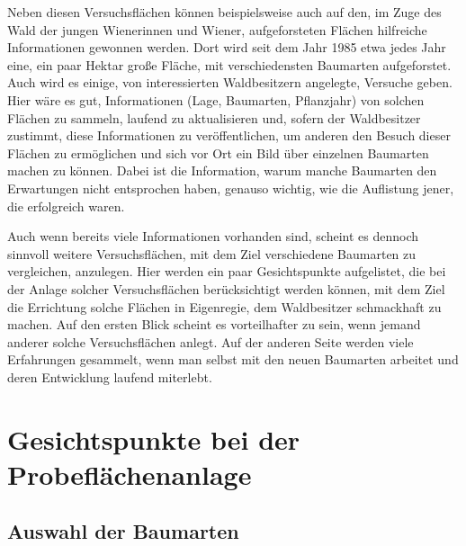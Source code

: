 \documentclass[twocolumn]{scrartcl}
\begin{document}
Neben diesen Versuchsflächen können beispielsweise auch auf den, im Zuge des
\glqq{}Wald der jungen Wienerinnen und Wiener\grqq{}, aufgeforsteten Flächen
hilfreiche Informationen gewonnen werden. Dort wird seit dem Jahr 1985 etwa
jedes Jahr eine, ein paar Hektar große Fläche, mit verschiedensten Baumarten
aufgeforstet. Auch wird es einige, von interessierten Waldbesitzern angelegte,
Versuche geben. Hier wäre es gut, Informationen (Lage, Baumarten, Pflanzjahr)
von solchen Flächen zu sammeln, laufend zu aktualisieren und, sofern der
Waldbesitzer zustimmt, diese Informationen zu veröffentlichen, um anderen den
Besuch dieser Flächen zu ermöglichen und sich vor Ort ein Bild über einzelnen
Baumarten machen zu können. Dabei ist die Information, warum manche Baumarten
den Erwartungen nicht entsprochen haben, genauso wichtig, wie die Auflistung
jener, die erfolgreich waren.

Auch wenn bereits viele Informationen vorhanden sind, scheint es dennoch
sinnvoll weitere Versuchsflächen, mit dem Ziel verschiedene Baumarten zu
vergleichen, anzulegen. Hier werden ein paar Gesichtspunkte aufgelistet, die bei
der Anlage solcher Versuchsflächen berücksichtigt werden können, mit dem Ziel
die Errichtung solche Flächen in Eigenregie, dem Waldbesitzer schmackhaft zu
machen. Auf den ersten Blick scheint es vorteilhafter zu sein, wenn jemand
anderer solche Versuchsflächen anlegt. Auf der anderen Seite werden viele
Erfahrungen gesammelt, wenn man selbst mit den neuen Baumarten arbeitet und
deren Entwicklung laufend miterlebt.

\section{Gesichtspunkte bei der Probeflächenanlage}

\subsection{Auswahl der Baumarten}
\end{document}
